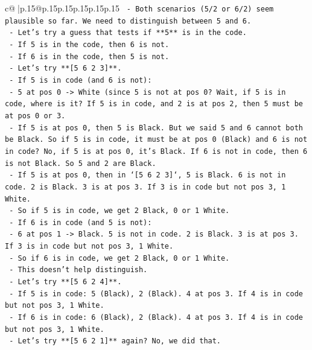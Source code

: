 \documentclass{article}
\begin{document}
{\begin{supertabular}{c@{$\;$}|p{.15\linewidth}@{}p{.15\linewidth}p{.15\linewidth}p{.15\linewidth}p{.15\linewidth}p{.15\linewidth}}
{{{\texttt{            {-} Both scenarios (5/2 or 6/2) seem plausible so far. We need to distinguish between 5 and 6.} \\
\texttt{            {-} Let's try a guess that tests if **5** is in the code.} \\
\texttt{            {-} If 5 is in the code, then 6 is not.} \\
\texttt{            {-} If 6 is in the code, then 5 is not.} \\
\texttt{            {-} Let's try **{[}5 6 2 3{]}**.} \\
\texttt{                {-} If 5 is in code (and 6 is not):} \\
\texttt{                    {-} 5 at pos 0 {-}> White (since 5 is not at pos 0? Wait, if 5 is in code, where is it? If 5 is in code, and 2 is at pos 2, then 5 must be at pos 0 or 3.} \\
\texttt{                    {-} If 5 is at pos 0, then 5 is Black. But we said 5 and 6 cannot both be Black. So if 5 is in code, it must be at pos 0 (Black) and 6 is not in code? No, if 5 is at pos 0, it's Black. If 6 is not in code, then 6 is not Black. So 5 and 2 are Black.} \\
\texttt{                    {-} If 5 is at pos 0, then in `{[}5 6 2 3{]}`, 5 is Black. 6 is not in code. 2 is Black. 3 is at pos 3. If 3 is in code but not pos 3, 1 White.} \\
\texttt{                    {-} So if 5 is in code, we get 2 Black, 0 or 1 White.} \\
\texttt{                {-} If 6 is in code (and 5 is not):} \\
\texttt{                    {-} 6 at pos 1 {-}> Black. 5 is not in code. 2 is Black. 3 is at pos 3. If 3 is in code but not pos 3, 1 White.} \\
\texttt{                    {-} So if 6 is in code, we get 2 Black, 0 or 1 White.} \\
\texttt{            {-} This doesn't help distinguish.} \\
\texttt{            {-} Let's try **{[}5 6 2 4{]}**.} \\
\texttt{                {-} If 5 is in code: 5 (Black), 2 (Black). 4 at pos 3. If 4 is in code but not pos 3, 1 White.} \\
\texttt{                {-} If 6 is in code: 6 (Black), 2 (Black). 4 at pos 3. If 4 is in code but not pos 3, 1 White.} \\
\texttt{            {-} Let's try **{[}5 6 2 1{]}** again? No, we did that.} \\
}}}
\end{supertabular}}
\end{document}

